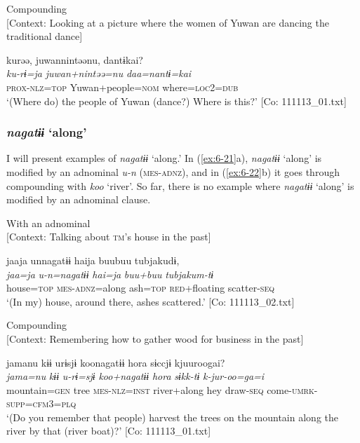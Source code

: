 \ex Compounding\\{}
[Context: Looking at a picture where the women of Yuwan are dancing the traditional dance]

{\TM}
\glll kurəə,  juwannintəənu,  dantɨkai?\\
      \textit{ku-rɨ=ja}  \textit{juwan+nintəə=nu}  \textit{daa=nantɨ=kai}\\
      \textsc{prox}-\textsc{nlz}=\textsc{top}  Yuwan+people=\textsc{nom}  where=\textsc{loc2}=\textsc{dub}\\
\glt ‘(Where do) the people of Yuwan (dance?) Where is this?’ [Co: 111113\_01.txt]
\z

\subsubsection{\textit{nagatɨɨ} ‘along’}

I will present examples of \textit{nagatɨɨ} ‘along.’ In (\ref{ex:6-21}a), \textit{nagatɨɨ} ‘along’ is modified by an adnominal \textit{u-n} (\textsc{mes}-\textsc{adnz}), and in (\ref{ex:6-22}b) it goes through compounding with \textit{koo} ‘river’. So far, there is no example where \textit{nagatɨɨ} ‘along’ is modified by an adnominal clause.

\ea\label{ex:6-22}
\ea With an adnominal\\{}
[Context: Talking about \textsc{tm}’s house in the past]

{\TM}
\glll jaaja  unnagatɨɨ  haija  buubuu  tubjakudɨ,\\
      \textit{jaa=ja}  \textit{u-n=nagatɨɨ}  \textit{hai=ja}  \textit{buu+buu}  \textit{tubjakum-tɨ}\\
      house=\textsc{top}  \textsc{mes}-\textsc{adnz}=along  ash=\textsc{top}  \textsc{red}+floating  scatter-\textsc{seq}\\
\glt ‘(In my) house, around there, ashes scattered.’ [Co: 111113\_02.txt]
\z

\ex Compounding\\{}
[Context: Remembering how to gather wood for business in the past]

{\TM}
\glll jamanu  kɨɨ  urɨsjɨ  koonagatɨɨ  {\textbar}hora{\textbar}   sɨccjɨ  kjuuroogai?\\
      \textit{jama=nu}  \textit{kɨɨ}  \textit{u-rɨ=sjɨ}  \textit{koo+nagatɨɨ}  \textit{hora}   \textit{sɨkk-tɨ}  \textit{k-jur-oo=ga=i}\\
      mountain=\textsc{gen}  tree  \textsc{mes}-\textsc{nlz}=\textsc{inst}  river+along  hey  draw-\textsc{seq}  come-\textsc{umrk}-\textsc{supp}=\textsc{cfm}3=\textsc{plq}\\
\glt ‘(Do you remember that people) harvest the trees on the mountain along the river by that (river boat)?’ [Co: 111113\_01.txt]
\z

